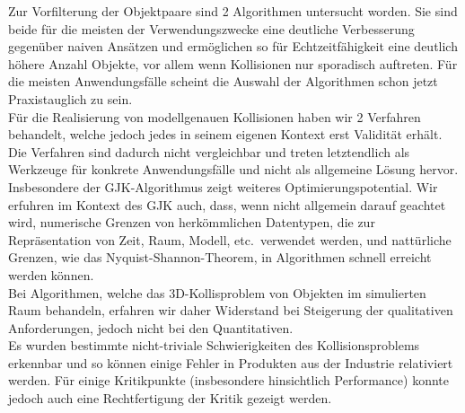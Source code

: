 

Zur Vorfilterung der Objektpaare sind 2 Algorithmen untersucht worden. Sie sind beide für die meisten der Verwendungszwecke  eine deutliche Verbesserung gegenüber naiven Ansätzen und ermöglichen so für Echtzeitfähigkeit eine deutlich höhere Anzahl Objekte, vor allem wenn Kollisionen nur sporadisch auftreten. Für die meisten Anwendungsfälle scheint die Auswahl der Algorithmen schon jetzt Praxistauglich zu sein.\\
Für die Realisierung von modellgenauen Kollisionen haben wir 2 Verfahren behandelt, welche jedoch jedes in seinem eigenen Kontext erst Validität erhält. Die Verfahren sind dadurch nicht vergleichbar und treten letztendlich als Werkzeuge für konkrete Anwendungsfälle und nicht als allgemeine Lösung hervor. Insbesondere der GJK-Algorithmus zeigt weiteres Optimierungspotential. Wir erfuhren im Kontext des GJK auch, dass, wenn nicht allgemein darauf geachtet wird, numerische Grenzen von herkömmlichen Datentypen, die zur Repräsentation von Zeit, Raum, Modell, etc.~verwendet werden, und nattürliche Grenzen, wie das Nyquist-Shannon-Theorem, in Algorithmen schnell erreicht werden können.\\
Bei Algorithmen, welche das 3D-Kollisproblem von Objekten im simulierten Raum behandeln, erfahren wir daher Widerstand bei Steigerung der qualitativen Anforderungen, jedoch nicht bei den Quantitativen.\\
Es wurden bestimmte nicht-triviale Schwierigkeiten des Kollisionsproblems erkennbar und so können einige Fehler in Produkten aus der Industrie relativiert werden. Für einige Kritikpunkte (insbesondere hinsichtlich Performance) konnte jedoch auch eine Rechtfertigung der Kritik gezeigt werden.
